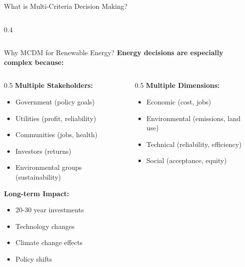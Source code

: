 \documentclass[aspectratio=169]{beamer}
\begin{document}
\begin{frame}{What is Multi-Criteria Decision Making?}
\begin{columns}
\begin{column}{0.4\textwidth}
\end{column}
\end{columns}
\end{frame}

\begin{frame}{Why MCDM for Renewable Energy?}
\textbf{Energy decisions are especially complex because:}

\begin{columns}
\begin{column}{0.5\textwidth}
\textcolor{energygreen}{\textbf{Multiple Stakeholders:}}
\begin{itemize}
\item Government (policy goals)
\item Utilities (profit, reliability)
\item Communities (jobs, health)
\item Investors (returns)
\item Environmental groups (sustainability)
\end{itemize}

\textcolor{solarorange}{\textbf{Long-term Impact:}}
\begin{itemize}
\item 20-30 year investments
\item Technology changes
\item Climate change effects
\item Policy shifts
\end{itemize}
\end{column}
\begin{column}{0.5\textwidth}
\textcolor{windblue}{\textbf{Multiple Dimensions:}}
\begin{itemize}
\item Economic (cost, jobs)
\item Environmental (emissions, land use)
\item Technical (reliability, efficiency)
\item Social (acceptance, equity)
\end{itemize}


\end{column}
\end{columns}
\end{frame}
\end{document}
